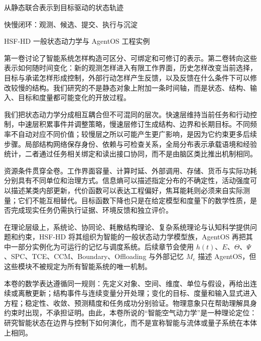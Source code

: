\begin{introduction}
    \item 从静态联合表示到目标驱动的状态轨迹
    \item 快慢闭环：观测、候选、提交、执行与沉淀
    \item HSF-HD 一般状态动力学与 AgentOS 工程实例
\end{introduction}

第一卷讨论了智能系统怎样构造可区分、可绑定和可修订的表示。第二卷转向这些表示如何随时间变化：新的观测怎样进入有限工作界面，历史怎样改变当前选择，目标与承诺怎样形成控制，外部行动怎样产生反馈，以及反馈在什么条件下可以修改较慢的结构。我们研究的不是静态对象上附加一条时间轴，而是状态、结构、输入、目标和度量都可能变化的开放过程。

我们把状态动力学分成相互耦合但不可混同的层次。快速层维持当前任务和行动控制，中速层积累事件并调整策略，慢速层修订生成结构、边界和长期目标。不同频率不自动对应不同价值；较慢层之所以可能产生更广影响，是因为它约束更多后续步骤。局部结构网络保存身份、依赖与可检查关系，全局分布表示承载语境和经验统计，二者通过任务相关绑定和读出接口协同，而不是由脑区类比推出机制相同。

资源条件贯穿全卷。工作界面容量、计算时延、外部调用、存储、货币与实际功耗分别具有不同单位和治理方式。信息熵可以描述指定分布的不确定性，活动强度可以描述某类内部更新，代价函数可以表达工程偏好，焦耳能耗则必须来自实际测量；它们不能互相替代。目标函数下降也只是在给定模型和度量下的数学性质，是否完成现实任务仍需执行证据、环境反馈和独立评价。

在理论层级上，系统论、协同论、耗散结构理论、复杂系统理论与认知科学提供问题和约束，HSF-HD 将其组织为智能的一般状态动力学模型族，AgentOS 再把其中一部分实例化为可运行的记忆与调度系统。后续章节会使用 $h(t)$、$E$、$\Theta$、$\Psi$、SPC、TCE、CCM、Boundary、Offloading 与外部记忆 $M_e$ 描述 AgentOS，但这些模块不被规定为所有智能系统的唯一机制。

本卷的数学表达遵循同一规则：先定义对象、空间、维度、单位与假设，再给出连续或离散更新；结构事件与连续变量分开处理；变化的目标、度量和输入显式进入方程；稳定性、收敛、预测精度和任务成功分别验证。物理意象只在帮助理解具身约束时出现，不承担证明。由此，本卷所说的“智能空气动力学”是一种理论定位：研究智能状态在边界与控制下如何演化，而不是宣称智能与流体或量子系统在本体上相同。
